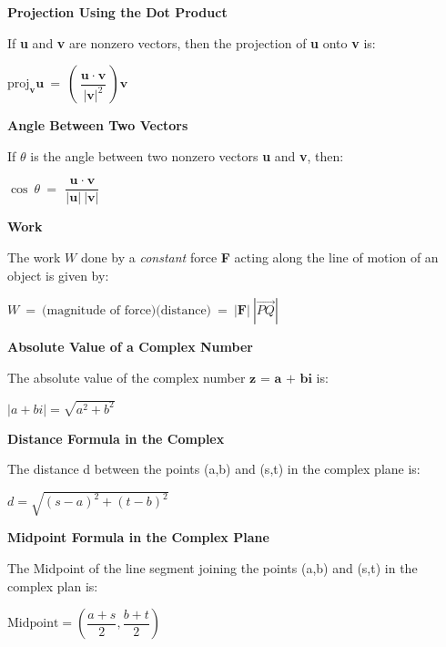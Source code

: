 \documentclass{article}
\begin{document}
\begin{large}
\textbf{Projection Using the Dot Product}

\hspace{1.0in} If \textbf{u} and \textbf{v} are nonzero vectors, then the projection of \textbf{u} onto \textbf{v} is:

\hspace{2.5in} $\text{proj}_{\textbf{v}}\textbf{u}\ =\ \left(\dfrac{\textbf{u}\ \cdot\ \textbf{v}}{|\textbf{v}|^{2}}\right)\textbf{v}$

\vspace{0.25in}

\textbf{Angle Between Two Vectors}

\hspace{1.0in} If $\theta$ is the angle between two nonzero vectors \textbf{u} and \textbf{v}, then:

\hspace{2.5in} $\cos \ \theta\ =\ \dfrac{\textbf{u}\ \cdot\ \textbf{v}}{| \textbf{u}|\ | \textbf{v}|}$

\vspace{0.3in}

\textbf{Work}

\hspace{0.1in} The work $W$ done by a \textit{constant} force \textbf{F} acting along the line of motion of an object is given by:

\hspace{1.8in} $W\ =\ \text{(magnitude of force)(distance)}\ =\ | \textbf{F}|\ | \overrightarrow{PQ}|$

\textbf{Absolute Value of a Complex Number}

The absolute value of the complex number $\textbf{z\ =\ a\ +\ bi}$ is:

\hspace{1.5in} \Large$|a+bi|=\sqrt{a^{2}+b^{2}}$

\textbf{Distance Formula in the Complex}

The distance d between the points (a,b) and (s,t) in the complex plane is:

\hspace{2.0in}$d={\sqrt{(s-a)^2+(t-b)^2}}$

\textbf{Midpoint Formula in the Complex Plane}

The Midpoint of the line segment joining the points (a,b) and (s,t) in the complex plan is:

\vspace{-0.2in}
\hspace{2.0in}$\text{Midpoint}=(\dfrac{a + s}{2},\dfrac{b+t}{2})$


\end{large}
\end{document}
